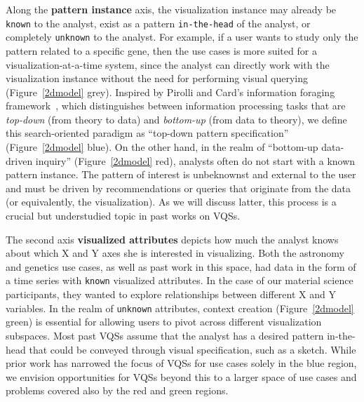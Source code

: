 \par Along the \textbf{pattern instance} axis, the visualization instance may already be \texttt{known} to the analyst, exist as a pattern \texttt{in-the-head} of the analyst, or completely \texttt{unknown} to the analyst. For example, if a user wants to study only the pattern related to a specific gene, then the use cases is more suited for a visualization-at-a-time system, since the analyst can directly work with the visualization instance without the need for performing visual querying (Figure~\ref{2dmodel} grey). Inspired by Pirolli and Card's information foraging framework~\cite{Pirolli}, which distinguishes between information processing tasks that are \textit{top-down} (from theory to data) and \textit{bottom-up} (from data to theory), we define this search-oriented paradigm as ``top-down pattern specification'' (Figure~\ref{2dmodel} blue). On the other hand, in the realm of ``bottom-up data-driven inquiry'' (Figure~\ref{2dmodel} red), analysts often do not start with a known pattern instance. The pattern of interest is unbeknownst and external to the user and must be driven by recommendations or queries that originate from the data (or equivalently, the visualization). As we will discuss latter, this process is a crucial but understudied topic in past works on VQSs.
\par The second axis \textbf{visualized attributes} depicts how much the analyst knows about which X and Y axes she is interested in visualizing. Both the astronomy and genetics use cases, as well as past work in this space, had data in the form of a time series with \texttt{known} visualized attributes. In the case of our material science participants, they wanted to explore relationships between different X and Y variables. In the realm of \texttt{unknown} attributes, context creation (Figure~\ref{2dmodel} green) is essential for allowing users to pivot across different visualization subspaces. Most past VQSs assume that the analyst has a desired pattern in-the-head that could be conveyed through visual specification, such as a sketch. While prior work has narrowed the focus of VQSs for use cases solely in the blue region, we envision opportunities for VQSs beyond this to a larger space of use cases and problems covered also by the red and green regions. 
